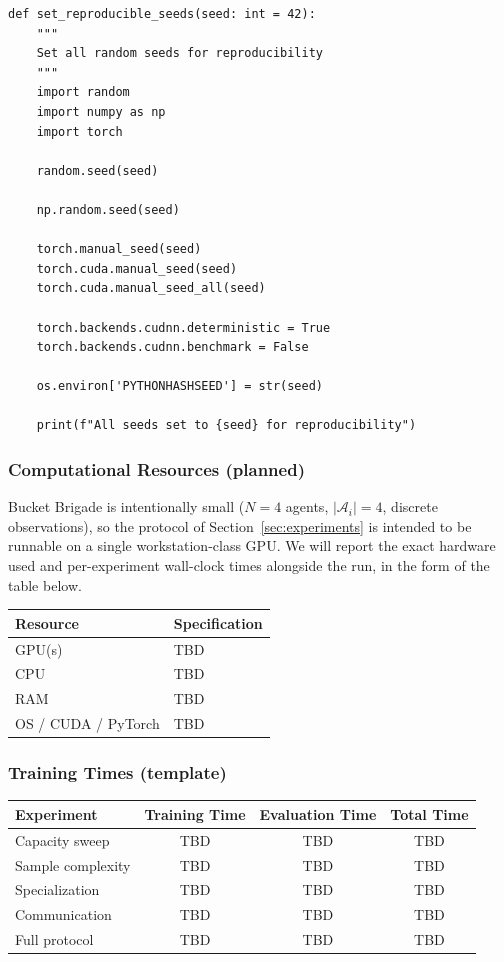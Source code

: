 \documentclass[10pt, letterpaper]{article}
\begin{document}
\begin{lstlisting}
def set_reproducible_seeds(seed: int = 42):
    """
    Set all random seeds for reproducibility
    """
    import random
    import numpy as np
    import torch

    random.seed(seed)

    np.random.seed(seed)

    torch.manual_seed(seed)
    torch.cuda.manual_seed(seed)
    torch.cuda.manual_seed_all(seed)

    torch.backends.cudnn.deterministic = True
    torch.backends.cudnn.benchmark = False

    os.environ['PYTHONHASHSEED'] = str(seed)

    print(f"All seeds set to {seed} for reproducibility")
\end{lstlisting}

\subsubsection{Computational Resources (planned)}

Bucket Brigade is intentionally small ($N{=}4$ agents, $|\mathcal{A}_i|{=}4$, discrete observations), so the protocol of Section~\ref{sec:experiments} is intended to be runnable on a single workstation-class GPU. We will report the exact hardware used and per-experiment wall-clock times alongside the run, in the form of the table below.

\begin{center}
\begin{tabular}{ll}
\toprule
\textbf{Resource} & \textbf{Specification} \\
\midrule
GPU(s) & TBD \\
CPU & TBD \\
RAM & TBD \\
OS / CUDA / PyTorch & TBD \\
\bottomrule
\end{tabular}
\end{center}

\subsubsection{Training Times (template)}

\begin{center}
\begin{tabular}{lccc}
\toprule
\textbf{Experiment} & \textbf{Training Time} & \textbf{Evaluation Time} & \textbf{Total Time} \\
\midrule
Capacity sweep    & TBD & TBD & TBD \\
Sample complexity & TBD & TBD & TBD \\
Specialization    & TBD & TBD & TBD \\
Communication     & TBD & TBD & TBD \\
Full protocol     & TBD & TBD & TBD \\
\bottomrule
\end{tabular}
\end{center}
\end{document}
